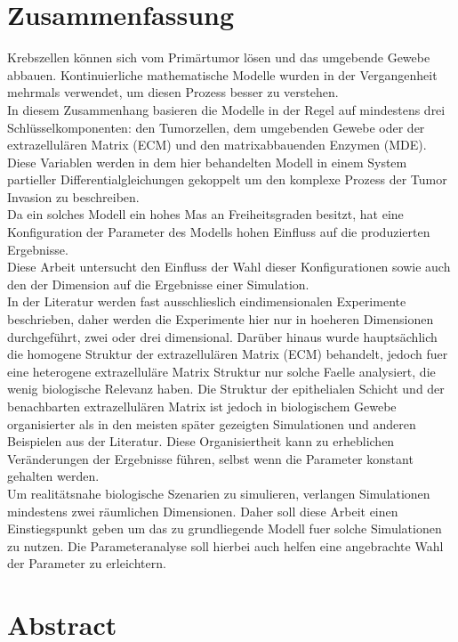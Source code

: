 \section*{Zusammenfassung}

Krebszellen können sich vom Primärtumor lösen und das umgebende Gewebe abbauen. 
Kontinuierliche mathematische Modelle wurden in der Vergangenheit mehrmals verwendet, um diesen Prozess besser zu verstehen.\\
In diesem Zusammenhang basieren die Modelle in der Regel auf mindestens drei Schlüsselkomponenten: den Tumorzellen, dem umgebenden Gewebe oder der extrazellulären Matrix (ECM) und den matrixabbauenden Enzymen (MDE). Diese Variablen werden in dem hier behandelten Modell in einem System partieller Differentialgleichungen gekoppelt um den komplexe Prozess der Tumor Invasion zu beschreiben.\\
Da ein solches Modell ein hohes Mas an Freiheitsgraden besitzt, hat eine Konfiguration der Parameter des Modells hohen Einfluss auf die produzierten Ergebnisse.\\
Diese Arbeit untersucht den Einfluss der Wahl dieser Konfigurationen sowie auch den der Dimension auf die Ergebnisse einer Simulation.\\ 
In der Literatur werden fast ausschlieslich eindimensionalen Experimente beschrieben, daher werden die Experimente hier nur in hoeheren Dimensionen durchgeführt, zwei oder drei dimensional. Darüber hinaus wurde hauptsächlich die homogene Struktur der extrazellulären Matrix (ECM) behandelt, jedoch fuer eine heterogene extrazelluläre Matrix Struktur nur solche Faelle analysiert, die wenig biologische Relevanz haben. Die Struktur der epithelialen Schicht und der benachbarten extrazellulären Matrix ist jedoch in biologischem Gewebe organisierter als in den meisten später gezeigten Simulationen und anderen Beispielen aus der Literatur. Diese Organisiertheit kann zu erheblichen Veränderungen der Ergebnisse führen, selbst wenn die Parameter konstant gehalten werden.\\
Um realitätsnahe biologische Szenarien zu simulieren, verlangen Simulationen mindestens zwei räumlichen Dimensionen. Daher soll diese Arbeit einen Einstiegspunkt geben um das zu grundliegende Modell fuer solche Simulationen zu nutzen. Die Parameteranalyse soll hierbei auch helfen eine angebrachte Wahl der Parameter zu erleichtern.

\clearpage
\section*{Abstract}

